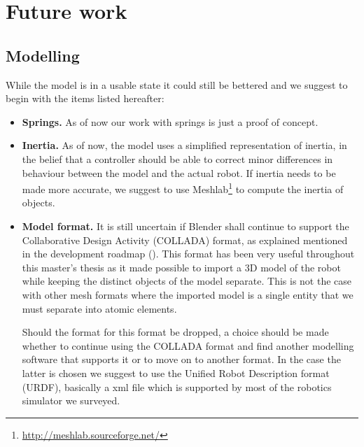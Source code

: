 \section{Future work}
\subsection{Modelling}
While the model is in a usable state it could still be bettered and we suggest to begin with the items listed hereafter:
\begin{itemize}
\item \textbf{Springs.} As of now our work with springs is just a proof of concept.

\item \textbf{Inertia.} As of now, the model uses a simplified representation of inertia, in the belief that a controller should be able to correct minor differences in behaviour between the model and the actual robot. If inertia needs to be made more accurate, we suggest to use Meshlab\footnote{\url{http://meshlab.sourceforge.net/}} to compute the inertia of objects.

\item \textbf{Model format.} It is still uncertain if Blender shall continue to support the Collaborative Design Activity (COLLADA) format, as explained mentioned in the development roadmap (\cite{blender_roadmap}). This format has been very useful throughout this master's thesis as it made possible to import a 3D model of the robot while keeping the distinct objects of the model separate. This is not the case with other mesh formats where the imported model is a single entity that we must separate into atomic elements. 

Should the format for this format be dropped, a choice should be made whether to continue using the COLLADA format and find another modelling software that supports it or to move on to another format. In the case the latter is chosen we suggest to use the Unified Robot Description format (URDF), basically a xml file which is supported by most of the robotics simulator we surveyed.

\end{itemize}

